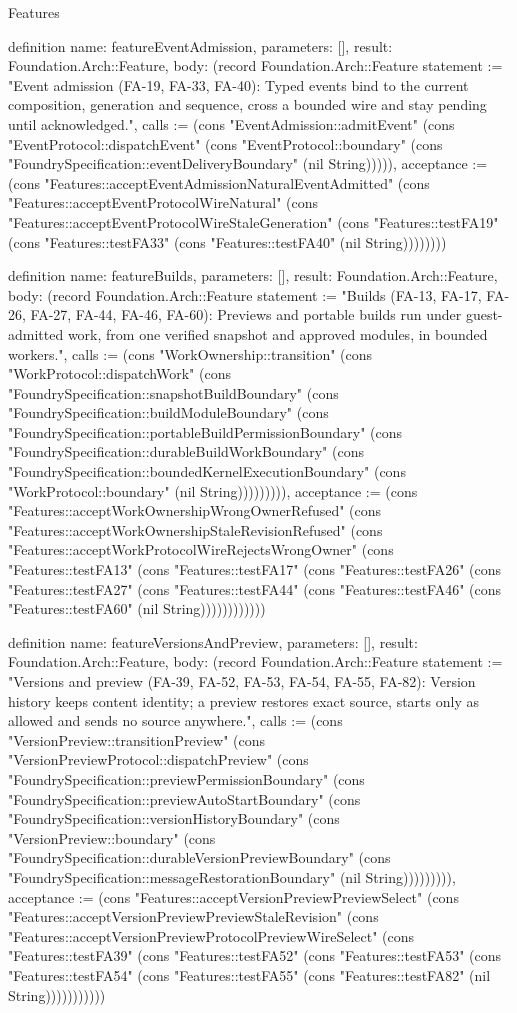 \begin{lexlean}{Features}
\begin{semanticmodule}
definition{
  name: featureEventAdmission,
  parameters: [],
  result: Foundation.Arch::Feature,
  body: (record Foundation.Arch::Feature {statement := "Event admission (FA-19, FA-33, FA-40): Typed events bind to the current composition, generation and sequence, cross a bounded wire and stay pending until acknowledged.", calls := (cons "EventAdmission::admitEvent" (cons "EventProtocol::dispatchEvent" (cons "EventProtocol::boundary" (cons "FoundrySpecification::eventDeliveryBoundary" (nil String))))), acceptance := (cons "Features::acceptEventAdmissionNaturalEventAdmitted" (cons "Features::acceptEventProtocolWireNatural" (cons "Features::acceptEventProtocolWireStaleGeneration" (cons "Features::testFA19" (cons "Features::testFA33" (cons "Features::testFA40" (nil String)))))))})
}

definition{
  name: featureBuilds,
  parameters: [],
  result: Foundation.Arch::Feature,
  body: (record Foundation.Arch::Feature {statement := "Builds (FA-13, FA-17, FA-26, FA-27, FA-44, FA-46, FA-60): Previews and portable builds run under guest-admitted work, from one verified snapshot and approved modules, in bounded workers.", calls := (cons "WorkOwnership::transition" (cons "WorkProtocol::dispatchWork" (cons "FoundrySpecification::snapshotBuildBoundary" (cons "FoundrySpecification::buildModuleBoundary" (cons "FoundrySpecification::portableBuildPermissionBoundary" (cons "FoundrySpecification::durableBuildWorkBoundary" (cons "FoundrySpecification::boundedKernelExecutionBoundary" (cons "WorkProtocol::boundary" (nil String))))))))), acceptance := (cons "Features::acceptWorkOwnershipWrongOwnerRefused" (cons "Features::acceptWorkOwnershipStaleRevisionRefused" (cons "Features::acceptWorkProtocolWireRejectsWrongOwner" (cons "Features::testFA13" (cons "Features::testFA17" (cons "Features::testFA26" (cons "Features::testFA27" (cons "Features::testFA44" (cons "Features::testFA46" (cons "Features::testFA60" (nil String)))))))))))})
}

definition{
  name: featureVersionsAndPreview,
  parameters: [],
  result: Foundation.Arch::Feature,
  body: (record Foundation.Arch::Feature {statement := "Versions and preview (FA-39, FA-52, FA-53, FA-54, FA-55, FA-82): Version history keeps content identity; a preview restores exact source, starts only as allowed and sends no source anywhere.", calls := (cons "VersionPreview::transitionPreview" (cons "VersionPreviewProtocol::dispatchPreview" (cons "FoundrySpecification::previewPermissionBoundary" (cons "FoundrySpecification::previewAutoStartBoundary" (cons "FoundrySpecification::versionHistoryBoundary" (cons "VersionPreview::boundary" (cons "FoundrySpecification::durableVersionPreviewBoundary" (cons "FoundrySpecification::messageRestorationBoundary" (nil String))))))))), acceptance := (cons "Features::acceptVersionPreviewPreviewSelect" (cons "Features::acceptVersionPreviewPreviewStaleRevision" (cons "Features::acceptVersionPreviewProtocolPreviewWireSelect" (cons "Features::testFA39" (cons "Features::testFA52" (cons "Features::testFA53" (cons "Features::testFA54" (cons "Features::testFA55" (cons "Features::testFA82" (nil String))))))))))})
}


\end{semanticmodule}
\end{lexlean}
